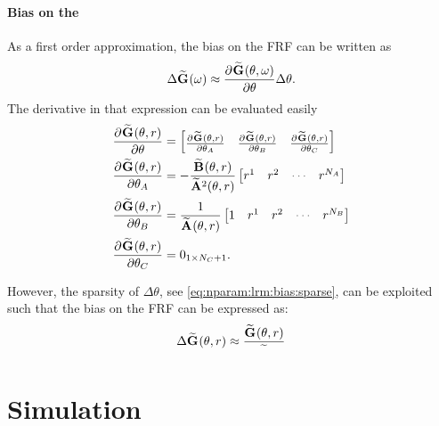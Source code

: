 \paragraph{Bias on the }
As a first order approximation, the bias on the \gls{FRF} can be written as
\begin{equation}
  \Delta \mathbf{\widetilde{G}}_{} (\omega) 
     \approx 
        \frac{{\partial}^{} \mathbf{\widetilde{G}}_{} (\theta, \omega)}{\partial \theta} 
      \Delta \theta
      \text{.}
\end{equation}
The derivative in that expression can be evaluated easily
\begin{align}
    \PartialDerivative{\LocalModel{G}(\theta, r)}{\theta} 
     &=
     \begin{bmatrix}
       \PartialDerivative{\LocalModel{G}(\theta,r)}{\theta_A} &
       \PartialDerivative{\LocalModel{G}(\theta,r)}{\theta_B} &
       \PartialDerivative{\LocalModel{G}(\theta,r)}{\theta_C} 
     \end{bmatrix}
     \\
     \PartialDerivative{\LocalModel{G}(\theta, r)}{\theta_A} 
     &=
     - \frac{\LocalModel{B}(\theta, r)}{\LocalModel{A}^2(\theta, r)}
     \begin{bmatrix}
         r^1 & r^2 & \deemph{\cdots} & r^{\order{A}}
     \end{bmatrix}
     \\
     \PartialDerivative{\LocalModel{G}(\theta, r)}{\theta_B} 
     &=
     \frac{1}{\LocalModel{A}(\theta, r)}
     \begin{bmatrix}
         1 & r^1 & r^2 & \deemph{\cdots} & r^{\order{B}}
     \end{bmatrix}
     \\
     \PartialDerivative{\LocalModel{G}(\theta, r)}{\theta_C} 
     &=
     \Zero{1 \times \order{C}+1}
     \text{.}
\end{align}

However, the sparsity of $\Delta\theta$, see \eqref{eq:nparam:lrm:bias:sparse}, can be exploited such that the bias on the \gls{FRF} can be expressed as:
\begin{equation}
  \Delta \mathbf{\widetilde{G}}_{} (\theta,r)
  \approx
  \frac{\mathbf{\widetilde{G}}_{} (\theta, r)}{\mathbf{\widetilde{}}_{} }
\end{equation}

\section{Simulation}
\label{sec:simulations}

